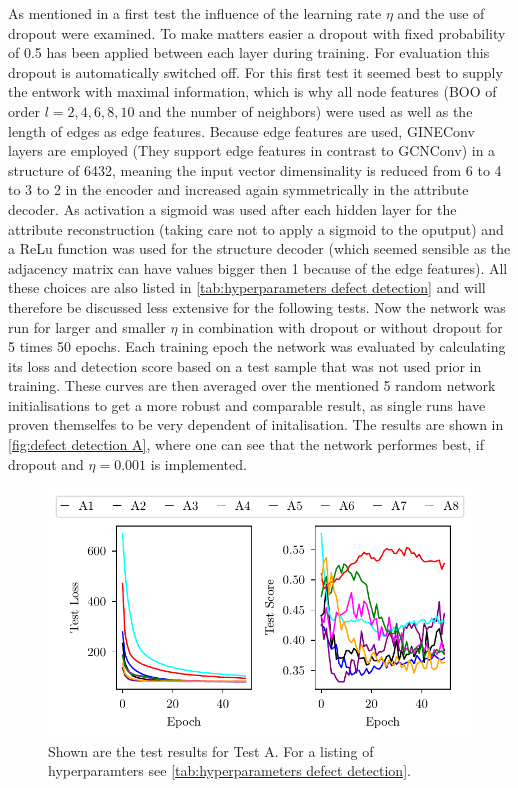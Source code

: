 \documentclass[11pt,a4paper]{article}
\begin{document}
As mentioned in a first test the influence of the learning rate $\eta$ and the use of dropout were examined. 
To make matters easier a dropout with fixed probability of 0.5 has been applied between each layer during training. 
For evaluation this dropout is automatically switched off. 
For this first test it seemed best to supply the entwork with maximal information, which is why all node features (BOO of order $l=2,4,6,8,10$ and the number of neighbors) were used as well as the length of edges as edge features. 
Because edge features are used, GINEConv layers are employed (They support edge features in contrast to GCNConv) in a structure of 6432, meaning the input vector dimensinality is reduced from 6 to 4 to 3 to 2 in the encoder and increased again symmetrically in the attribute decoder. 
As activation a sigmoid was used after each hidden layer for the attribute reconstruction (taking care not to apply a sigmoid to the oputput) and a ReLu function was used for the structure decoder (which seemed sensible as the adjacency matrix can have values bigger then 1 because of the edge features). 
All these choices are also listed in \autoref{tab:hyperparameters defect detection} and will therefore be discussed less extensive for the following tests. 
Now the network was run for larger and smaller $\eta$ in combination with dropout or without dropout for 5 times 50 epochs. 
Each training epoch the network was evaluated by calculating its loss and detection score based on a test sample that was not used prior in training.
These curves are then averaged over the mentioned 5 random network initialisations to get a more robust and comparable result, as single runs have proven themselfes to be very dependent of initalisation. 
The results are shown in \autoref{fig:defect detection A}, where one can see that the network performes best, if dropout and $\eta=0.001$ is implemented. 
\begin{figure}[htbp]
    \centering
    \includegraphics{images/plots/defect_detection_A.pdf}
    \caption{Shown are the test results for Test A. For a listing of hyperparamters see \autoref{tab:hyperparameters defect detection}.}
    \label{fig:defect detection A}
\end{figure}
\end{document}
